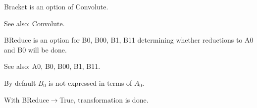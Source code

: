 


Bracket is an option of Convolute.

See also:  Convolute.



BReduce is an option for B0, B00, B1, B11 determining whether reductions to A0 and B0 will be done.

See also:  A0, B0, B00, B1, B11.


By default \({B_0}\) is not expressed in terms of \({A_0}\).





With BReduce\(\rightarrow \)True, transformation is done.




